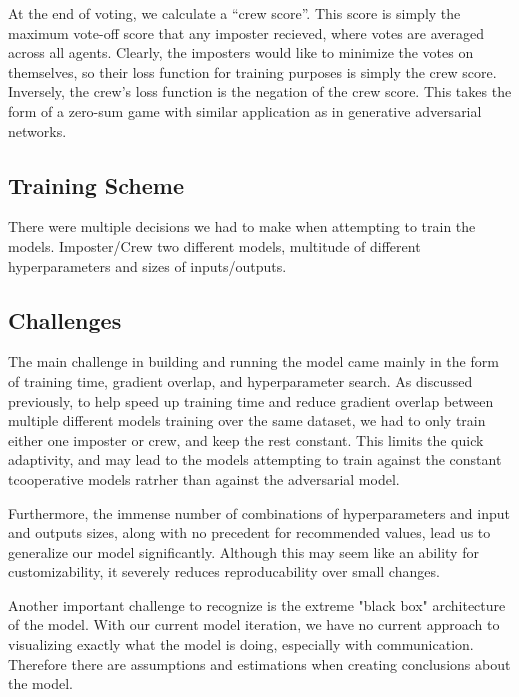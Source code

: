 \documentclass[10pt,twocolumn,letterpaper]{article}
\begin{document}
At the end of voting, we calculate a ``crew score''. This score is simply the
maximum vote-off score that any imposter recieved, where votes
are averaged across all agents. Clearly, the imposters would like to minimize the
votes on themselves, so their loss function for training purposes is
simply the crew score. Inversely, the crew's loss function is the negation of
the crew score. This takes the form of a zero-sum game with similar application
as in generative adversarial networks.
\subsection{Training Scheme}
There were multiple decisions we had to make when attempting to train the models.
Imposter/Crew two different models, multitude of different hyperparameters and
sizes of inputs/outputs.
\subsection{Challenges}
The main challenge in building and running the model
came mainly in the form of training time, gradient overlap, 
and hyperparameter search. As discussed previously, to help speed up training time
and reduce gradient overlap between multiple different models training over the
same dataset, we had to only train either one imposter or crew, and keep the rest constant.
This limits the quick adaptivity, and may lead to the models attempting to train
against the constant tcooperative models ratrher than against the adversarial model.

Furthermore, the immense number of combinations of hyperparameters
and input and outputs sizes, along with no precedent for recommended values,
lead us to generalize our model significantly. Although this may seem like an ability for
customizability, it severely reduces reproducability over small changes. 

Another important challenge to recognize is the extreme "black box" architecture
of the model. With our current model iteration, we have no current approach to visualizing
exactly what the model is doing, especially with communication. Therefore there are
assumptions and estimations when creating conclusions about the model.
\end{document}
